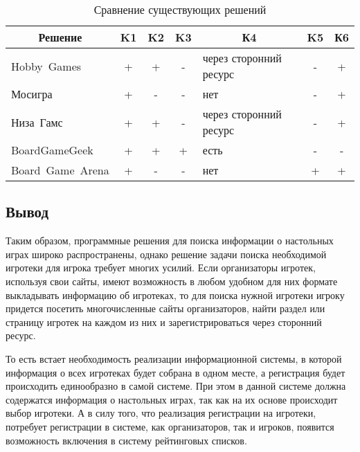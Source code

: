 \captionsetup{format=hang,justification=raggedright,
              singlelinecheck=off,width=13.5cm}
\begin{longtable}[Hc]{|p{4cm}|c|c|c|p{3.5cm}|c|c|}
\caption{Сравнение существующих решений\label{tab:01}}\\
    \hline
    \multicolumn{1}{|c}{\textbf{Решение}} & \multicolumn{1}{|c|}{\textbf{K1}} &
    \multicolumn{1}{c|}{\textbf{K2}} & \multicolumn{1}{c}{\textbf{K3}} &
    \multicolumn{1}{|c|}{\textbf{К4}} & \multicolumn{1}{c|}{\textbf{K5}} &
    \multicolumn{1}{c|}{\textbf{К6}}\\
    \hline
    \mbox{Hobby Games}      & + & + & - & через сторонний ресурс & - & + \\
    \hline                                                           
    \mbox{Мосигра}          & + & - & - & нет                    & - & + \\
    \hline                                                           
    \mbox{Низа Гамс}        & + & + & - & через сторонний ресурс & - & + \\
    \hline                                                           
    \mbox{BoardGameGeek}    & + & + & + & есть                   & - & - \\
    \hline                                                           
    \mbox{Board Game Arena} & + & - & - & нет                    & + & + \\
    \hline
\end{longtable}

\subsection*{Вывод}

Таким образом, программные решения для поиска информации о настольных играх
широко распространены, однако решение задачи поиска необходимой игротеки для
игрока требует многих усилий. Если организаторы игротек, используя свои сайты,
имеют возможность в любом удобном для них формате выкладывать информацию об
игротеках, то для поиска нужной игротеки игроку придется посетить многочисленные
сайты организаторов, найти раздел или страницу игротек на каждом из них и
зарегистрироваться через сторонний ресурс.

То есть встает необходимость реализации информационной системы, в которой
информация о всех игротеках будет собрана в одном месте, а регистрация будет
происходить единообразно в самой системе. При этом в данной системе должна
содержатся информация о настольных играх, так как на их основе происходит выбор
игротеки. А в силу того, что реализация регистрации на игротеки, потребует
регистрации в системе, как организаторов, так и игроков, появится возможность
включения в систему рейтинговых списков.


